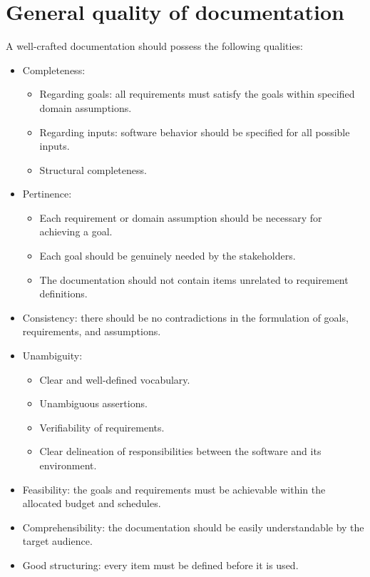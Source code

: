 \section{General quality of documentation}

A well-crafted documentation should possess the following qualities:
\begin{itemize}
    \item Completeness:
        \begin{itemize}
            \item Regarding goals: all requirements must satisfy the goals within specified domain assumptions.
            \item Regarding inputs: software behavior should be specified for all possible inputs.
            \item Structural completeness. 
        \end{itemize}
    \item Pertinence: 
        \begin{itemize}
            \item Each requirement or domain assumption should be necessary for achieving a goal.
            \item Each goal should be genuinely needed by the stakeholders.
            \item The documentation should not contain items unrelated to requirement definitions.
        \end{itemize}
    \item Consistency: there should be no contradictions in the formulation of goals, requirements, and assumptions.
    \item Unambiguity: 
        \begin{itemize}
            \item Clear and well-defined vocabulary.
            \item Unambiguous assertions. 
            \item Verifiability of requirements.
            \item Clear delineation of responsibilities between the software and its environment.
        \end{itemize}
    \item Feasibility: the goals and requirements must be achievable within the allocated budget and schedules.
    \item Comprehensibility: the documentation should be easily understandable by the target audience.
    \item Good structuring: every item must be defined before it is used.

\end{itemize}
